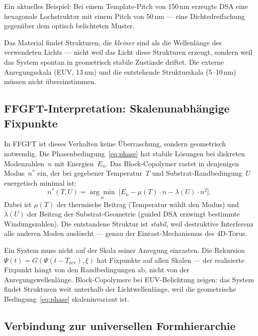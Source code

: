 \noindent Ein aktuelles Beispiel: Bei einem Template-Pitch von 150\,nm
erzeugte DSA eine hexagonale Lochstruktur mit einem Pitch von 50\,nm —
eine Dichtedreifachung gegenüber dem optisch belichteten Muster.

\begin{warnbox}
Das Material findet Strukturen, die \emph{kleiner} sind als die Wellenlänge
des verwendeten Lichts — nicht weil das Licht diese Strukturen erzeugt,
sondern weil das System spontan in geometrisch stabile Zustände driftet.
Die externe Anregungsskala (EUV, 13\,nm) und die entstehende Strukturskala
(5--10\,nm) müssen nicht übereinstimmen.
\end{warnbox}

\subsection{FFGFT-Interpretation: Skalenunabhängige Fixpunkte}

In FFGFT ist dieses Verhalten keine Überraschung, sondern geometrisch
notwendig. Die Phasenbedingung~\eqref{eq:phase} hat stabile Lösungen
bei diskreten Modenzahlen~$n$ mit Energien~$E_n$.
Das Block-Copolymer rastet in denjenigen Modus~$n^*$ ein, der bei
gegebener Temperatur~$T$ und Substrat-Randbedingung~$U$ energetisch
minimal ist:
\begin{equation}
  n^*(T, U) = \underset{n}{\arg\min}\;
    \bigl[ E_n - \mu(T)\cdot n - \lambda(U)\cdot n^2 \bigr].
\end{equation}
Dabei ist $\mu(T)$ der thermische Beitrag (Temperatur wählt den Modus)
und $\lambda(U)$ der Beitrag der Substrat-Geometrie (guided DSA erzwingt
bestimmte Windungszahlen). Die entstandene Struktur ist \emph{stabil},
weil destruktive Interferenz alle anderen Moden auslöscht — genau der
Einrast-Mechanismus des 4D-Torus.

\begin{keybox}
Ein System muss nicht auf der Skala seiner Anregung einrasten.
Die Rekursion $\Psi(t) = G(\Psi(t - T_{\text{rev}}), \xi)$ hat
Fixpunkte auf allen Skalen — der realisierte Fixpunkt hängt von
den Randbedingungen ab, nicht von der Anregungswellenlänge.
Block-Copolymere bei EUV-Belichtung zeigen: das System findet
Strukturen weit unterhalb der Lichtwellenlänge, weil die
geometrische Bedingung~\eqref{eq:phase} skaleninvariant ist.
\end{keybox}

\subsection{Verbindung zur universellen Formhierarchie}

